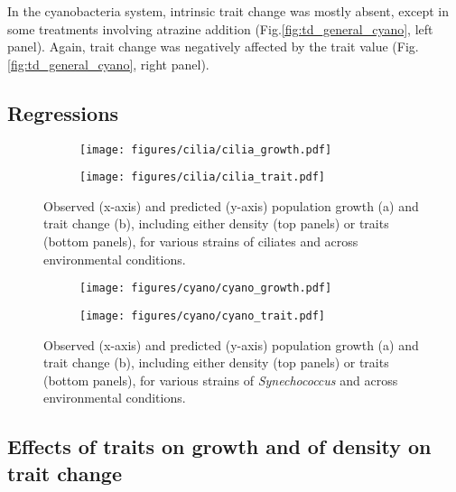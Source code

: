 \documentclass{getwriting}
\begin{document}
In the cyanobacteria system, intrinsic trait change was mostly absent, except in some treatments involving atrazine addition (Fig.\ref{fig:td_general_cyano}, left panel). Again, trait change was negatively affected by the trait value (Fig.\ref{fig:td_general_cyano}, right panel). 

\subsection{Regressions}

\begin{figure}[H]
    \begin{subfigure}{0.4\textwidth}
      \centering
      \texttt{[image: figures/cilia/cilia\_growth.pdf]}
      \caption{}
    \label{fig:ciliagrowth}
    \end{subfigure}\hfill
        \begin{subfigure}{0.4\textwidth}
      \centering
      \texttt{[image: figures/cilia/cilia\_trait.pdf]}
      \caption{}
      \label{fig:ciliatrait}
    \end{subfigure}\hfill
    \centering
    \caption{Observed (x-axis) and predicted (y-axis) population growth (a) and trait change (b), including either density (top panels) or traits (bottom panels), for various strains of ciliates and across environmental conditions.}
  \label{fig:ciliagrowthandtrait}
\end{figure}

\begin{figure}[H]
    \begin{subfigure}{0.4\textwidth}
      \centering
      \texttt{[image: figures/cyano/cyano\_growth.pdf]}
      \caption{}
    \label{fig:cyanogrowth}
    \end{subfigure}\hfill
        \begin{subfigure}{0.4\textwidth}
      \centering
      \texttt{[image: figures/cyano/cyano\_trait.pdf]}
      \caption{}
      \label{fig:cyanotrait}
    \end{subfigure}\hfill
    \centering
    \caption{Observed (x-axis) and predicted (y-axis) population growth (a) and trait change (b), including either density (top panels) or traits (bottom panels), for various strains of \textit{Synechococcus} and across environmental conditions.}
  \label{fig:cyanogrowthandtrait}
\end{figure}

\subsection{Effects of traits on growth and of density on trait change}
\end{document}
